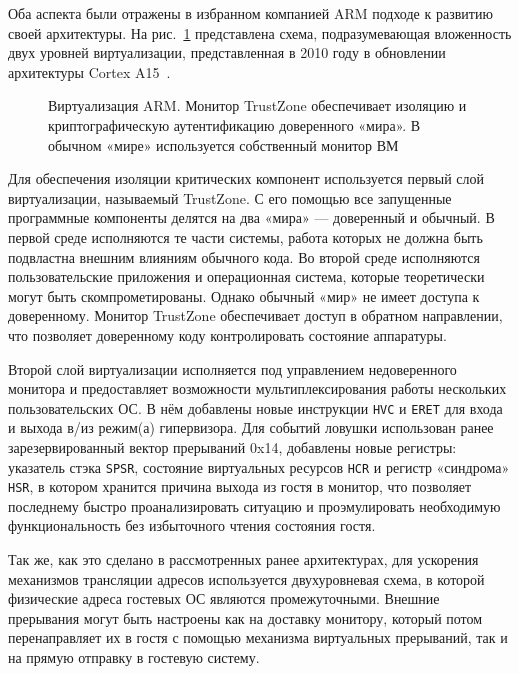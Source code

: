 Оба аспекта были отражены в избранном компанией ARM подходе к развитию своей архитектуры. На рис.~\ref{fig:arm-vt-trustzone} представлена схема, подразумевающая вложенность двух уровней виртуализации, представленная в 2010 году в обновлении архитектуры Cortex A15~\cite{arm-a15}. 

\begin{figure}[htb]
    \centering
    \caption[Виртуализация ARM]{Виртуализация ARM. Монитор TrustZone обеспечивает изоляцию и криптографическую аутентификацию доверенного «мира». В обычном «мире» используется собственный монитор ВМ}
    \label{fig:arm-vt-trustzone}
\end{figure}

Для обеспечения изоляции критических компонент используется первый слой виртуализации, называемый TrustZone. С его помощью все запущенные программные компоненты  делятся на два «мира» — доверенный и обычный. В первой среде исполняются те части системы, работа которых не должна быть подвластна внешним влияниям обычного кода. Во второй среде исполняются пользовательские приложения и операционная система, которые теоретически могут быть скомпрометированы. Однако обычный «мир» не имеет доступа к доверенному. Монитор TrustZone обеспечивает доступ в обратном направлении, что позволяет доверенному коду контролировать состояние аппаратуры.

Второй слой виртуализации исполняется под управлением недоверенного монитора и предоставляет возможности мультиплексирования работы нескольких пользовательских ОС. В нём добавлены новые инструкции \texttt{HVC} и \texttt{ERET} для входа и выхода в/из режим(а) гипервизора. Для событий ловушки использован ранее зарезервированный вектор прерываний 0x14, добавлены новые регистры: указатель стэка \texttt{SPSR}, состояние виртуальных ресурсов \texttt{HCR} и регистр «синдрома» \texttt{HSR}, в котором хранится причина выхода из гостя  в монитор, что позволяет последнему быстро проанализировать ситуацию и проэмулировать необходимую функциональность без избыточного чтения состояния гостя.

Так же, как это сделано в рассмотренных ранее архитектурах, для ускорения механизмов трансляции адресов используется двухуровневая схема, в которой физические адреса гостевых ОС являются промежуточными. Внешние прерывания могут быть настроены как на доставку монитору, который потом перенаправляет их в гостя с помощью механизма виртуальных прерываний, так и на прямую отправку в гостевую систему.

